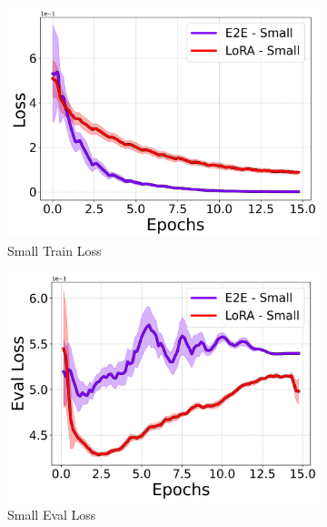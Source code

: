 \documentclass[10pt,twocolumn,letterpaper]{article}
\begin{document}
\begin{figure}[t]
    \begin{subfigure}[b]{0.24\textwidth}
        \centering
        \includegraphics[width=\textwidth]{./small/loss_line.png}
        \caption{Small Train Loss}
    \end{subfigure}
    \begin{subfigure}[b]{0.24\textwidth}
        \centering
        \includegraphics[width=\textwidth]{./small/eval_loss_line.png}
        \caption{Small Eval Loss}
    \end{subfigure}
    \begin{subfigure}[b]{0.24\textwidth}
        \centering

\end{subfigure}
\end{figure}
\end{document}
